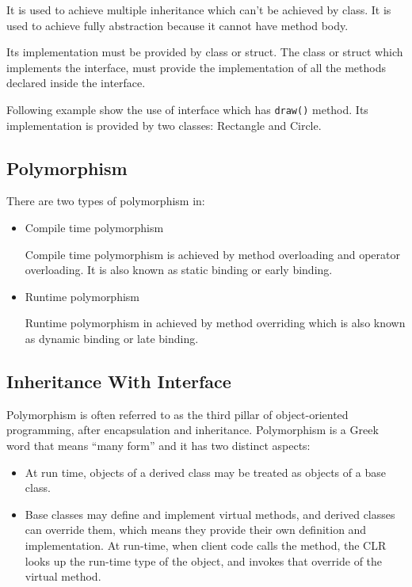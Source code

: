 It is used to achieve multiple inheritance which can't be achieved by class. It is used to achieve fully abstraction because it cannot have method body.

Its implementation must be provided by class or struct. The class or struct which implements the interface, must provide the implementation of all the methods declared inside the interface.


Following example show the use of interface which has \texttt{draw()} method. Its implementation is provided by two classes: Rectangle and Circle.


\subsection*{Polymorphism}
There are two types of polymorphism in: 
\begin{itemize}
	\item Compile time polymorphism
	
	Compile time polymorphism is achieved by method overloading and operator overloading. It is also known as static binding or early binding. 
	
	\item Runtime polymorphism
	
	Runtime polymorphism in achieved by method overriding which is also known as dynamic binding or late binding.
\end{itemize}





\subsection{Inheritance With Interface}
Polymorphism is often referred to as the third pillar of object-oriented programming, after
encapsulation and inheritance. Polymorphism is a Greek word that means ``many form'' and it has two distinct aspects:

\begin{itemize}
	\item At run time, objects of a derived class may be treated as objects of a base class.
	\item Base classes may define and implement virtual methods, and derived classes
	can override them, which means they provide their own definition and implementation. At run-time, when client code calls the method, the CLR looks up
	the run-time type of the object, and invokes that override of the virtual method.
\end{itemize}

